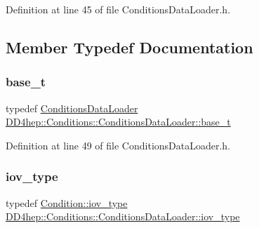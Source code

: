 Definition at line 45 of file Conditions\+Data\+Loader.\+h.



\subsection{Member Typedef Documentation}
\hypertarget{class_d_d4hep_1_1_conditions_1_1_conditions_data_loader_a22a3a55163245ff24bca31db419433be}{}\label{class_d_d4hep_1_1_conditions_1_1_conditions_data_loader_a22a3a55163245ff24bca31db419433be} 
\subsubsection{\texorpdfstring{base\+\_\+t}{base\_t}}
{\footnotesize\ttfamily typedef \hyperlink{class_d_d4hep_1_1_conditions_1_1_conditions_data_loader}{Conditions\+Data\+Loader} \hyperlink{class_d_d4hep_1_1_conditions_1_1_conditions_data_loader_a22a3a55163245ff24bca31db419433be}{D\+D4hep\+::\+Conditions\+::\+Conditions\+Data\+Loader\+::base\+\_\+t}}



Definition at line 49 of file Conditions\+Data\+Loader.\+h.

\hypertarget{class_d_d4hep_1_1_conditions_1_1_conditions_data_loader_a510aa9a02f5e798d8d96c9e3cb5a36af}{}\label{class_d_d4hep_1_1_conditions_1_1_conditions_data_loader_a510aa9a02f5e798d8d96c9e3cb5a36af} 
\subsubsection{\texorpdfstring{iov\+\_\+type}{iov\_type}}
{\footnotesize\ttfamily typedef \hyperlink{class_d_d4hep_1_1_conditions_1_1_condition_ad84300e226b2085ec5e9db7f47be5539}{Condition\+::iov\+\_\+type} \hyperlink{class_d_d4hep_1_1_conditions_1_1_conditions_data_loader_a510aa9a02f5e798d8d96c9e3cb5a36af}{D\+D4hep\+::\+Conditions\+::\+Conditions\+Data\+Loader\+::iov\+\_\+type}}



